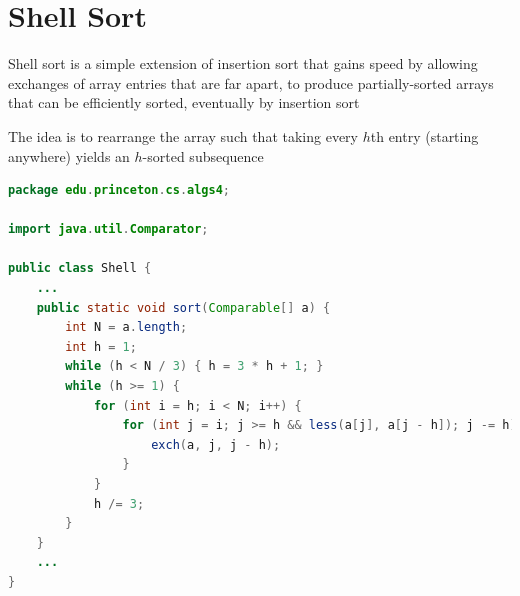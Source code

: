\documentclass[8pt,a4paper,compress]{beamer}
\begin{document}
\section{Shell Sort}
\begin{frame}[fragile]
\pause

Shell sort is a simple extension of insertion sort that gains speed by allowing exchanges of array entries that are far apart, to produce partially-sorted arrays that can be efficiently sorted, eventually by insertion sort

\pause
\bigskip

The idea is to rearrange the array such that taking every $h$th entry (starting anywhere) yields an $h$-sorted subsequence

\pause
\bigskip

\begin{lstlisting}[language=Java]
package edu.princeton.cs.algs4;

import java.util.Comparator;

public class Shell {
    ...
    public static void sort(Comparable[] a) {
        int N = a.length; 
        int h = 1;
        while (h < N / 3) { h = 3 * h + 1; }
        while (h >= 1) {
            for (int i = h; i < N; i++) {
                for (int j = i; j >= h && less(a[j], a[j - h]); j -= h) {
                    exch(a, j, j - h);
                }
            }
            h /= 3;
        }    
    }
    ...
}
\end{lstlisting}
\end{frame}
\end{document}
